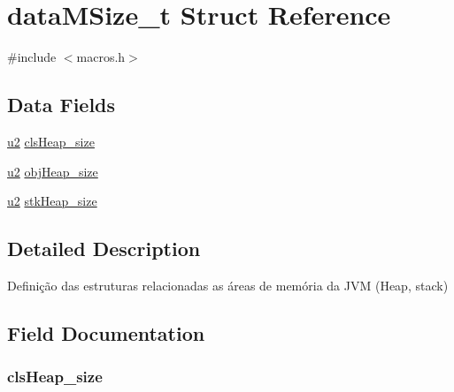 \hypertarget{structdata_m_size__t}{}\section{data\+M\+Size\+\_\+t Struct Reference}
\label{structdata_m_size__t}


{\ttfamily \#include $<$macros.\+h$>$}

\subsection*{Data Fields}
\begin{DoxyCompactItemize}
\item 
\hyperlink{macros_8h_a732cde1300aafb73b0ea6c2558a7a54f}{u2} \hyperlink{structdata_m_size__t_af267c29dd653df69be2f190a1bce1e78}{cls\+Heap\+\_\+size}
\item 
\hyperlink{macros_8h_a732cde1300aafb73b0ea6c2558a7a54f}{u2} \hyperlink{structdata_m_size__t_ad0752dbc8eb091b917dcbf1dee42d4b1}{obj\+Heap\+\_\+size}
\item 
\hyperlink{macros_8h_a732cde1300aafb73b0ea6c2558a7a54f}{u2} \hyperlink{structdata_m_size__t_a057c7536c63c45165af2cb634abe052f}{stk\+Heap\+\_\+size}
\end{DoxyCompactItemize}


\subsection{Detailed Description}
Definição das estruturas relacionadas as áreas de memória da J\+V\+M (Heap, stack) 

\subsection{Field Documentation}
\hypertarget{structdata_m_size__t_af267c29dd653df69be2f190a1bce1e78}{}
\subsubsection[{cls\+Heap\+\_\+size}]{ cls\+Heap\+\_\+size}\label{structdata_m_size__t_af267c29dd653df69be2f190a1bce1e78}
\hypertarget{structdata_m_size__t_ad0752dbc8eb091b917dcbf1dee42d4b1}{}
